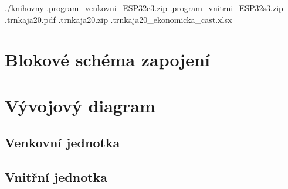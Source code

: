         .\hspace{2cm}/knihovny\newline
        .\hspace{2cm}\hbox{program\_venkovni\_ESP32c3.zip}\newline
        .\hspace{2cm}\hbox{program\_vnitrni\_ESP32s3.zip}\newline
        .\hspace{1cm}trnkaja20.pdf\newline
        .\hspace{1cm}trnkaja20.zip\newline
        .\hspace{1cm}\hbox{trnkaja20\_ekonomicka\_cast.xlsx}\newline
        
        \clearpage
        
    \chapter{Blokové schéma zapojení}
    
        \begin{figure}[htb]
        \end{figure}

        \clearpage
        
    \chapter{Vývojový diagram}
        \section{Venkovní jednotka}
            \begin{figure}[htb]
            \end{figure}

            \clearpage

        \section{Vnitřní jednotka}
            \begin{figure}[htb]
            \end{figure}

